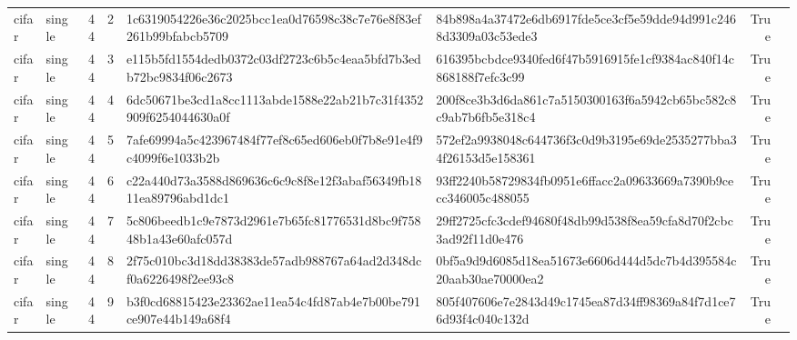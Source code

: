 \begin{tabular}{llrrllrl}
cifar & single & 44 & 2 & 1c6319054226e36c2025bcc1ea0d76598c38c7e76e8f83ef261b99bfabcb5709 & 84b898a4a37472e6db6917fde5ce3cf5e59dde94d991c2468d3309a03c53ede3 & True &  \\
cifar & single & 44 & 3 & e115b5fd1554dedb0372c03df2723c6b5c4eaa5bfd7b3edb72bc9834f06c2673 & 616395bcbdce9340fed6f47b5916915fe1cf9384ac840f14c868188f7efc3c99 & True &  \\
cifar & single & 44 & 4 & 6dc50671be3cd1a8cc1113abde1588e22ab21b7c31f4352909f6254044630a0f & 200f8ce3b3d6da861c7a5150300163f6a5942cb65bc582c8c9ab7b6fb5e318c4 & True &  \\
cifar & single & 44 & 5 & 7afe69994a5c423967484f77ef8c65ed606eb0f7b8e91e4f9c4099f6e1033b2b & 572ef2a9938048c644736f3c0d9b3195e69de2535277bba34f26153d5e158361 & True &  \\
cifar & single & 44 & 6 & c22a440d73a3588d869636c6c9c8f8e12f3abaf56349fb1811ea89796abd1dc1 & 93ff2240b58729834fb0951e6ffacc2a09633669a7390b9cecc346005c488055 & True &  \\
cifar & single & 44 & 7 & 5c806beedb1c9e7873d2961e7b65fc81776531d8bc9f75848b1a43e60afc057d & 29ff2725cfc3cdef94680f48db99d538f8ea59cfa8d70f2cbc3ad92f11d0e476 & True &  \\
cifar & single & 44 & 8 & 2f75c010bc3d18dd38383de57adb988767a64ad2d348dcf0a6226498f2ee93c8 & 0bf5a9d9d6085d18ea51673e6606d444d5dc7b4d395584c20aab30ae70000ea2 & True &  \\
cifar & single & 44 & 9 & b3f0cd68815423e23362ae11ea54c4fd87ab4e7b00be791ce907e44b149a68f4 & 805f407606e7e2843d49c1745ea87d34ff98369a84f7d1ce76d93f4c040c132d & True &  \\
\bottomrule
\end{tabular}
